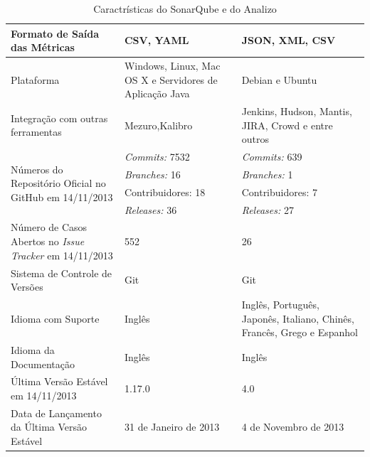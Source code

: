 \begin{savenotes}
\begin{table}[!ht]
\begin{tabular}{|p{5cm}|p{4.5cm}|p{5cm}|}
Formato de Saída das Métricas  & CSV, YAML & JSON, XML, CSV \\ \hline

Plataforma  &Windows, Linux, Mac OS X e Servidores de Aplicação Java & Debian e Ubuntu                                                                                              \\ \hline

Integração com outras ferramentas & Mezuro,Kalibro & Jenkins, Hudson, Mantis, JIRA, Crowd e entre outros \\ \hline

\multirow{4}{5cm}{Números do Repositório Oficial no GitHub em 14/11/2013}
& \textit{Commits:} 7532 & \textit{Commits:} 639\\ \cline{2-3} 

&\textit{Branches:} 16 & \textit{Branches:} 1  \\ \cline{2-3} 
& Contribuidores: 18 & Contribuidores: 7  \\ \cline{2-3} 
& \textit{Releases:} 36  & \textit{Releases:} 27

 \\ \hline

Número de Casos Abertos no \textit{Issue Tracker} em 14/11/2013 & 552  & 26 
\\ \hline

Sistema de Controle de Versões & Git & Git \\ \hline

Idioma com Suporte & Inglês & Inglês, Português, Japonês, Italiano, Chinês, Francês, Grego e Espanhol \\ \hline

Idioma da Documentação & Inglês & Inglês

\\ \hline
Última Versão Estável em 14/11/2013 & 1.17.0 & 4.0  

\\ \hline
Data de Lançamento da Última Versão Estável & 31 de Janeiro de 2013 & 4 de Novembro de 2013

\\ \hline
\end{tabular}
\caption{Caractrísticas do SonarQube e do Analizo}
\label{dados-ferramentas-estatica}
\end{table}
\FloatBarrier
\end{savenotes}

